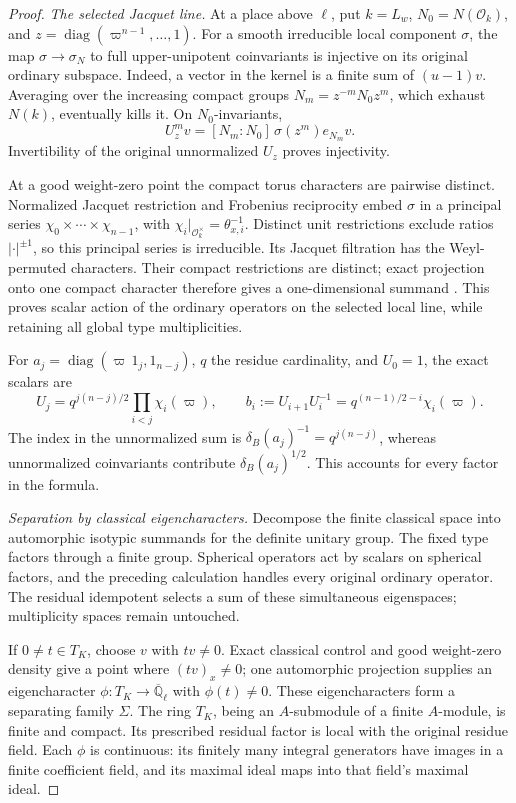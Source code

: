 \begin{proof}
\emph{The selected Jacquet line.}
At a place above \(\ell\), put \(k=L_w\),
\(N_0=N(\mathcal O_k)\), and
\(z=\operatorname{diag}(\varpi^{n-1},\ldots,1)\).
For a smooth irreducible local component \(\sigma\), the map
\(\sigma\to\sigma_N\) to full upper-unipotent coinvariants is
injective on its original ordinary subspace.  Indeed, a vector
in the kernel is a finite sum of \((u-1)v\).  Averaging over the
increasing compact groups \(N_m=z^{-m}N_0z^m\), which exhaust
\(N(k)\), eventually kills it.  On \(N_0\)-invariants,
\[
 U_z^m v=[N_m:N_0]\,\sigma(z^m)e_{N_m}v.
\]
Invertibility of the original unnormalized \(U_z\) proves
injectivity.

At a good weight-zero point the compact torus characters are
pairwise distinct.  Normalized Jacquet restriction and Frobenius
reciprocity embed \(\sigma\) in a principal series
\(\chi_0\times\cdots\times\chi_{n-1}\), with
\(\chi_i|_{\mathcal O_k^\times}=\theta_{x,i}^{-1}\).
Distinct unit restrictions exclude ratios \(|\cdot|^{\pm1}\),
so this principal series is irreducible.  Its Jacquet filtration
has the Weyl-permuted characters.  Their compact restrictions
are distinct; exact projection onto one compact character
therefore gives a one-dimensional summand
\cite{SelmerHeckeDetBZ}.  This proves scalar action of the
ordinary operators on the selected local line, while retaining
all global type multiplicities.

For \(a_j=\operatorname{diag}(\varpi\,1_j,1_{n-j})\), \(q\) the
residue cardinality, and \(U_0=1\), the exact scalars are
\begin{equation}\label{eq:selmer-hecke-determinant-U}
 U_j=q^{j(n-j)/2}\prod_{i<j}\chi_i(\varpi),\qquad
 b_i:=U_{i+1}U_i^{-1}
       =q^{(n-1)/2-i}\chi_i(\varpi).
\end{equation}
The index in the unnormalized sum is
\(\delta_B(a_j)^{-1}=q^{j(n-j)}\), whereas unnormalized
coinvariants contribute \(\delta_B(a_j)^{1/2}\).  This accounts
for every factor in the formula.

\emph{Separation by classical eigencharacters.}
Decompose the finite classical space into automorphic isotypic
summands for the definite unitary group.  The fixed type factors
through a finite group.  Spherical operators act by scalars on
spherical factors, and the preceding calculation handles every
original ordinary operator.  The residual idempotent selects a
sum of these simultaneous eigenspaces; multiplicity spaces
remain untouched.

If \(0\ne t\in T_K\), choose \(v\) with \(tv\ne0\).  Exact
classical control and good weight-zero density give a point where
\((tv)_x\ne0\); one automorphic projection supplies an eigencharacter
\(\phi:T_K\to\overline{\mathbb Q}_\ell\) with \(\phi(t)\ne0\).
These eigencharacters form a separating family \(\Sigma\).
The ring \(T_K\), being an \(A\)-submodule of a finite
\(A\)-module, is finite and compact.  Its prescribed residual
factor is local with the original residue field.  Each \(\phi\)
is continuous: its finitely many integral generators have images
in a finite coefficient field, and its maximal ideal maps into
that field's maximal ideal.


\end{proof}
